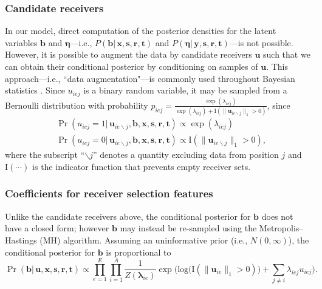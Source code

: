 \documentclass[ba]{imsart}
\numberwithin{equation}{section}
\theoremstyle{plain}
\begin{document}
	\subsubsection{Candidate receivers}
	In our model, direct computation of the posterior densities for the latent variables $\boldsymbol{b}$ and $\boldsymbol{\eta}$---i.e., $P(\boldsymbol{b}|\,\boldsymbol{x},\boldsymbol{s}, \boldsymbol{r},\boldsymbol{t})$ and $P(\boldsymbol{\eta}|\,\boldsymbol{y},\boldsymbol{s}, \boldsymbol{r},\boldsymbol{t})$---is not possible. However, it is possible to augment the data by candidate receivers $\boldsymbol{u}$ such that we can obtain their conditional posterior by conditioning on samples of $\boldsymbol{u}$. %
	This approach---i.e., ``data augmentation"---is commonly used throughout Bayesian statistics \citep{tanner1987calculation,neal2015exact}. Since $u_{iej}$ is a binary random variable, it may be sampled from a Bernoulli distribution with probability $p_{iej} =\frac{\exp(\lambda_{iej})}{\exp(\lambda_{iej})+\text{I}(\lVert\boldsymbol{u}_{ie\backslash j}\rVert_1 > 0 )}$, since
	\begin{equation}
		\begin{aligned}
			&\Pr(u_{iej}=1| \,\boldsymbol{u}_{ie\backslash j}, \boldsymbol{b}, \boldsymbol{x},\boldsymbol{s}, \boldsymbol{r},\boldsymbol{t}) \propto \exp(\lambda_{iej}) \\
			&\Pr(u_{iej}=0|\, \boldsymbol{u}_{ie\backslash j},\boldsymbol{b}, \boldsymbol{x},\boldsymbol{s}, \boldsymbol{r},\boldsymbol{t})\propto \text{I}(\lVert\boldsymbol{u}_{ie\backslash j}\rVert_1 > 0 ),
		\end{aligned}
		\label{eqn:latentreceiver}
	\end{equation}
	where the subscript ``$\backslash j$'' denotes a quantity excluding data from position $j$ and $\text{I}(\cdots)$ is the indicator function that prevents empty receiver sets. 
	\subsubsection{Coefficients for receiver selection features}
	Unlike the candidate receivers above, the conditional posterior for $\boldsymbol{b}$ does not have a closed form; however $\boldsymbol{b}$ may instead be re-sampled using the Metropolis--Hastings (MH) algorithm. Assuming an uninformative prior (i.e., $N({0},\infty)$), the conditional posterior for $\boldsymbol{b}$ is proportional to~
	\begin{equation}
		\Pr(\boldsymbol{b}| \,\boldsymbol{u}, \boldsymbol{x}, \boldsymbol{s}, \boldsymbol{r},\boldsymbol{t})\propto \prod_{e=1}^E
		\prod_{i=1}^A \frac{1}{Z(\boldsymbol{\lambda}_{ie})}\exp\Big(\mbox{log}\big(\text{I}( \lVert \boldsymbol{u}_{ie}\rVert_1 > 0)\big) + \sum\limits_{j \neq i} \lambda_{iej}u_{iej}\Big).
		\label{eqn:latentedge}
	\end{equation}
\end{document}
